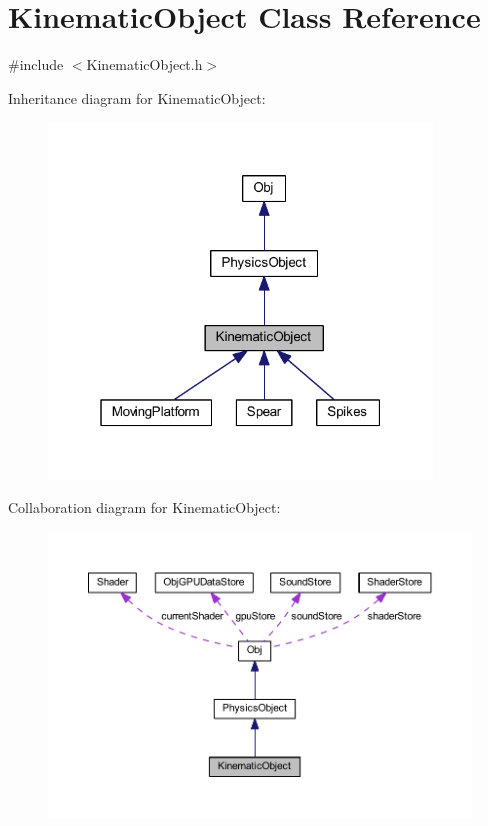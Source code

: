 \hypertarget{class_kinematic_object}{}\section{Kinematic\+Object Class Reference}
\label{class_kinematic_object}


{\ttfamily \#include $<$Kinematic\+Object.\+h$>$}



Inheritance diagram for Kinematic\+Object\+:
\nopagebreak
\begin{figure}[H]
\begin{center}
\leavevmode
\includegraphics[width=289pt]{class_kinematic_object__inherit__graph}
\end{center}
\end{figure}


Collaboration diagram for Kinematic\+Object\+:
\nopagebreak
\begin{figure}[H]
\begin{center}
\leavevmode
\includegraphics[width=350pt]{class_kinematic_object__coll__graph}
\end{center}
\end{figure}
